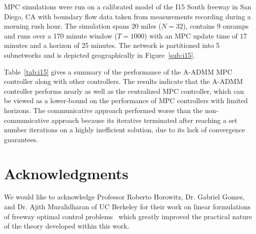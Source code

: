 MPC simulations were run on a calibrated model of the I15 South freeway in San Diego, CA with boundary flow data taken from measurements recording during a morning rush hour. The simulation spans 20 miles ($N=32$), contains 9 onramps and runs over a 170 minute window ($T=1000$) with an MPC update time of 17 minutes and a horizon of 25 minutes. The network is partitioned into 5 subnetworks and is depicted geographically in Figure~\ref{sub:i15}.

Table~\ref{tab:i15} gives a summary of the performance of the A-ADMM MPC controller along with other controllers. The results indicate that the A-ADMM controller performs nearly as well as the centralized MPC controller, which can be viewed as a lower-bound on the performance of MPC controllers with limited horizons. The communicative approach performed worse than the non-communicative approach because its iterative terminated after reaching a set number iterations on a highly inefficient solution, due to its lack of convergence guarantees.

\section*{Acknowledgments}

We would like to acknowledge Professor Roberto Horowitz, Dr. Gabriel Gomes, and Dr. Ajith Muralidharan of UC Berkeley for their work on linear formulations of freeway optimal control problems~\cite{gomes2006optimal,Muralidharana} which greatly improved the practical nature of the theory developed within this work.